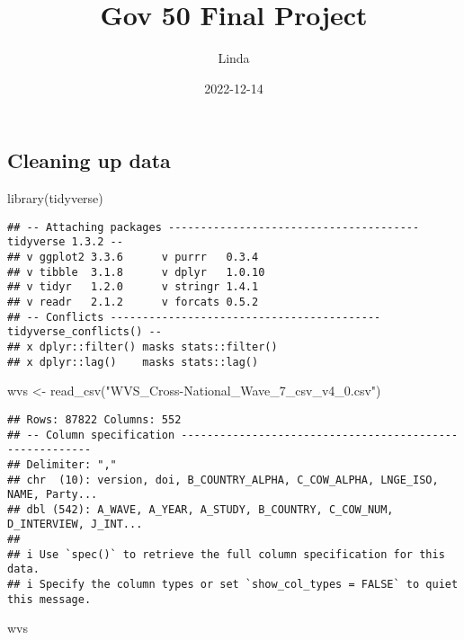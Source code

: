 \documentclass[
]{article}
\title{Gov 50 Final Project}
\author{Linda}
\date{2022-12-14}
\newenvironment{Shaded}{\begin{snugshade}}{\end{snugshade}}
\newcommand{\FunctionTok}[1]{\textcolor[rgb]{0.00,0.00,0.00}{#1}}
\newcommand{\NormalTok}[1]{#1}
\newcommand{\OtherTok}[1]{\textcolor[rgb]{0.56,0.35,0.01}{#1}}
\newcommand{\StringTok}[1]{\textcolor[rgb]{0.31,0.60,0.02}{#1}}
\begin{document}
\maketitle

\hypertarget{cleaning-up-data}{%
\subsection{Cleaning up data}\label{cleaning-up-data}}

\begin{Shaded}
\begin{Highlighting}[]
\FunctionTok{library}\NormalTok{(tidyverse)}
\end{Highlighting}
\end{Shaded}

\begin{verbatim}
## -- Attaching packages --------------------------------------- tidyverse 1.3.2 --
## v ggplot2 3.3.6      v purrr   0.3.4 
## v tibble  3.1.8      v dplyr   1.0.10
## v tidyr   1.2.0      v stringr 1.4.1 
## v readr   2.1.2      v forcats 0.5.2 
## -- Conflicts ------------------------------------------ tidyverse_conflicts() --
## x dplyr::filter() masks stats::filter()
## x dplyr::lag()    masks stats::lag()
\end{verbatim}

\begin{Shaded}
\begin{Highlighting}[]
\NormalTok{wvs }\OtherTok{\textless{}{-}} \FunctionTok{read\_csv}\NormalTok{(}\StringTok{"WVS\_Cross{-}National\_Wave\_7\_csv\_v4\_0.csv"}\NormalTok{)}
\end{Highlighting}
\end{Shaded}

\begin{verbatim}
## Rows: 87822 Columns: 552
## -- Column specification --------------------------------------------------------
## Delimiter: ","
## chr  (10): version, doi, B_COUNTRY_ALPHA, C_COW_ALPHA, LNGE_ISO, NAME, Party...
## dbl (542): A_WAVE, A_YEAR, A_STUDY, B_COUNTRY, C_COW_NUM, D_INTERVIEW, J_INT...
## 
## i Use `spec()` to retrieve the full column specification for this data.
## i Specify the column types or set `show_col_types = FALSE` to quiet this message.
\end{verbatim}

\begin{Shaded}
\begin{Highlighting}[]
\NormalTok{wvs}
\end{Highlighting}
\end{Shaded}
\end{document}
